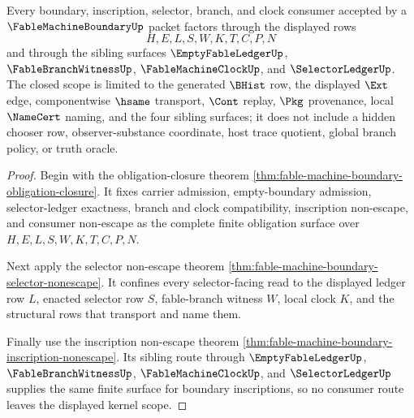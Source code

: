 \begin{theorem}
\label{thm:fable-machine-boundary-scoped-kernel-route}
Every boundary, inscription, selector, branch, and clock consumer accepted by a $\FableMachineBoundaryUp$ packet factors through the displayed rows
$$
H,E,L,S,W,K,T,C,P,N
$$
and through the sibling surfaces $\EmptyFableLedgerUp$, $\FableBranchWitnessUp$, $\FableMachineClockUp$, and $\SelectorLedgerUp$. The closed scope is limited to the generated $\BHist$ row, the displayed $\Ext$ edge, componentwise $\hsame$ transport, $\Cont$ replay, $\Pkg$ provenance, local $\NameCert$ naming, and the four sibling surfaces; it does not include a hidden chooser row, observer-substance coordinate, host trace quotient, global branch policy, or truth oracle.
\end{theorem}
\begin{proof}
Begin with the obligation-closure theorem \autoref{thm:fable-machine-boundary-obligation-closure}. It fixes carrier admission, empty-boundary admission, selector-ledger exactness, branch and clock compatibility, inscription non-escape, and consumer non-escape as the complete finite obligation surface over $H,E,L,S,W,K,T,C,P,N$.

Next apply the selector non-escape theorem \autoref{thm:fable-machine-boundary-selector-nonescape}. It confines every selector-facing read to the displayed ledger row $L$, enacted selector row $S$, fable-branch witness $W$, local clock $K$, and the structural rows that transport and name them.

Finally use the inscription non-escape theorem \autoref{thm:fable-machine-boundary-inscription-nonescape}. Its sibling route through $\EmptyFableLedgerUp$, $\FableBranchWitnessUp$, $\FableMachineClockUp$, and $\SelectorLedgerUp$ supplies the same finite surface for boundary inscriptions, so no consumer route leaves the displayed kernel scope.
\end{proof}



